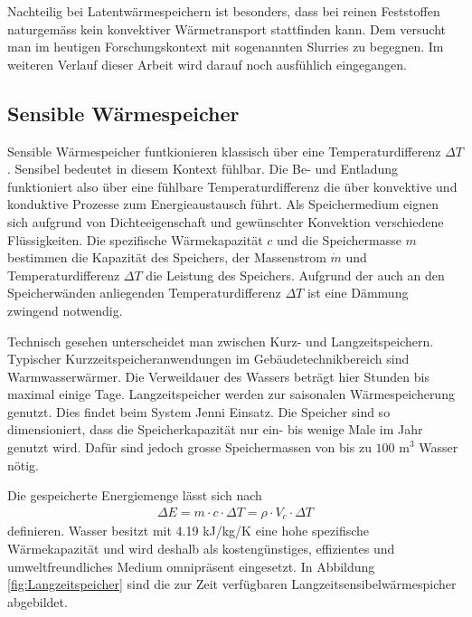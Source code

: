 \documentclass[11pt,a4paper]{scrartcl}
\begin{document}
Nachteilig bei Latentwärmespeichern ist besonders, dass bei reinen Feststoffen
naturgemäss kein konvektiver Wärmetransport stattfinden kann. Dem versucht man
im heutigen Forschungskontext mit sogenannten Slurries zu begegnen. Im weiteren
Verlauf dieser Arbeit wird darauf noch ausfühlich eingegangen. \cite{Wesselak}

\subsection{Sensible Wärmespeicher}

Sensible Wärmespeicher funtkionieren klassisch über eine Temperaturdifferenz
$\Delta T$. Sensibel bedeutet in diesem Kontext \flqq fühlbar\frqq{}. Die
Be- und Entladung funktioniert also über eine \flqq fühlbare\frqq{}
Temperaturdifferenz die über konvektive und konduktive Prozesse zum
Energieaustausch führt. Als Speichermedium eignen sich aufgrund von
Dichteeigenschaft und gewünschter Konvektion verschiedene Flüssigkeiten. Die spezifische
Wärmekapazität $c$ und die Speichermasse $m$ bestimmen die Kapazität des
Speichers, der Massenstrom $\dot{m}$ und Temperaturdifferenz $\Delta T$ die
Leistung des Speichers. Aufgrund der auch an den Speicherwänden anliegenden
Temperaturdifferenz $\Delta T$ ist eine Dämmung zwingend notwendig. 

Technisch gesehen unterscheidet man zwischen Kurz- und Langzeitspeichern.
Typischer Kurzzeitspeicheranwendungen im Gebäudetechnikbereich sind
Warmwasserwärmer. Die Verweildauer des Wassers beträgt hier Stunden bis maximal
einige Tage. Langzeitspeicher werden zur saisonalen Wärmespeicherung genutzt.
Dies findet beim \flqq System Jenni\frqq{} Einsatz. Die Speicher sind so
dimensioniert, dass die Speicherkapazität nur ein- bis wenige Male im Jahr
genutzt wird. Dafür sind jedoch grosse Speichermassen von bis zu $\text{100 m}^3$ Wasser
nötig.

Die gespeicherte Energiemenge lässt sich nach
\begin{align}
\Delta E = m \cdot c \cdot \Delta T = \rho \cdot V_c  \cdot \Delta T
\end{align}
definieren. Wasser besitzt mit 4.19 kJ/kg/K eine hohe spezifische
Wärmekapazität und wird deshalb als kostengünstiges, effizientes und
umweltfreundliches Medium omnipräsent eingesetzt.
In Abbildung \ref{fig:Langzeitspeicher} sind die zur Zeit verfügbaren
Langzeitsensibelwärmespicher abgebildet.
\end{document}
